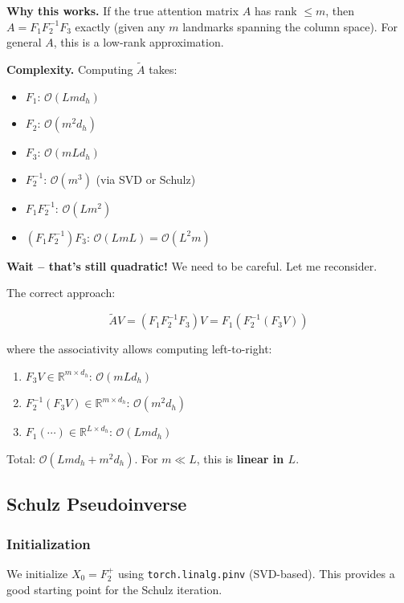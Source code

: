 \textbf{Why this works.} If the true attention matrix $A$ has rank $\le m$, then 
$A = F_1 F_2^{-1} F_3$ exactly (given any $m$ landmarks spanning the column 
space). For general $A$, this is a low-rank approximation.

\textbf{Complexity.} Computing $\tilde{A}$ takes:

\begin{itemize}
\item $F_1$: $\mathcal{O}(L m d_h)$
\item $F_2$: $\mathcal{O}(m^2 d_h)$
\item $F_3$: $\mathcal{O}(m L d_h)$
\item $F_2^{-1}$: $\mathcal{O}(m^3)$ (via SVD or Schulz)
\item $F_1 F_2^{-1}$: $\mathcal{O}(L m^2)$
\item $(F_1 F_2^{-1}) F_3$: $\mathcal{O}(L m L) = \mathcal{O}(L^2 m)$

\end{itemize}
\textbf{Wait -- that's still quadratic!} We need to be careful. Let me reconsider.

The correct approach:

\[
\tilde{A} V = (F_1 F_2^{-1} F_3) V = F_1 (F_2^{-1} (F_3 V))
\]

where the associativity allows computing left-to-right:

\begin{enumerate}
\item $F_3 V \in \mathbb{R}^{m \times d_h}$: $\mathcal{O}(m L d_h)$
\item $F_2^{-1} (F_3 V) \in \mathbb{R}^{m \times d_h}$: $\mathcal{O}(m^2 d_h)$
\item $F_1 (\cdots) \in \mathbb{R}^{L \times d_h}$: $\mathcal{O}(L m d_h)$

\end{enumerate}
Total: $\mathcal{O}(L m d_h + m^2 d_h)$. For $m \ll L$, this is \textbf{linear in $L$}.

\subsection{Schulz Pseudoinverse}

\subsubsection{Initialization}

We initialize $X_0 = F_2^+$ using \texttt{torch.linalg.pinv} (SVD-based). This 
provides a good starting point for the Schulz iteration.

